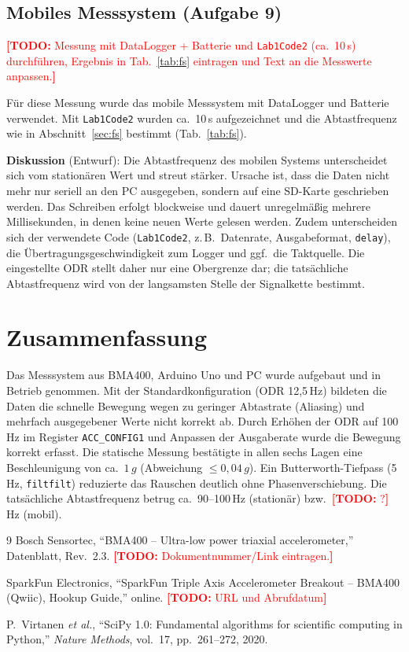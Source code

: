 \documentclass[a4paper,oneside,10pt]{article}
\newcommand{\todo}[1]{\textcolor{red}{\textbf{[TODO:} #1\textbf{]}}}
\begin{document}
\subsection{Mobiles Messsystem (Aufgabe 9)}

\todo{Messung mit DataLogger + Batterie und \texttt{Lab1Code2} (ca.\ 10\,s) durchführen,
Ergebnis in Tab.~\ref{tab:fs} eintragen und Text an die Messwerte anpassen.}

Für diese Messung wurde das mobile Messsystem mit DataLogger und Batterie verwendet.
Mit \texttt{Lab1Code2} wurden ca.\ 10\,s aufgezeichnet und die Abtastfrequenz wie in
Abschnitt~\ref{sec:fs} bestimmt (Tab.~\ref{tab:fs}).

\textbf{Diskussion} (Entwurf): Die Abtastfrequenz des mobilen Systems unterscheidet
sich vom stationären Wert und streut stärker. Ursache ist, dass die Daten nicht
mehr nur seriell an den PC ausgegeben, sondern auf eine SD-Karte geschrieben werden.
Das Schreiben erfolgt blockweise und dauert unregelmäßig mehrere Millisekunden, in
denen keine neuen Werte gelesen werden. Zudem unterscheiden sich der verwendete Code
(\texttt{Lab1Code2}, z.\,B.\ Datenrate, Ausgabeformat, \texttt{delay}), die
Übertragungsgeschwindigkeit zum Logger und ggf.\ die Taktquelle. Die eingestellte
ODR stellt daher nur eine Obergrenze dar; die tatsächliche Abtastfrequenz wird von
der langsamsten Stelle der Signalkette bestimmt.

\section{Zusammenfassung}
Das Messsystem aus BMA400, Arduino Uno und PC wurde aufgebaut und in Betrieb genommen.
Mit der Standardkonfiguration (ODR 12{,}5\,Hz) bildeten die Daten die schnelle
Bewegung wegen zu geringer Abtastrate (Aliasing) und mehrfach ausgegebener Werte
nicht korrekt ab. Durch Erhöhen der ODR auf 100\,Hz im Register \texttt{ACC\_CONFIG1}
und Anpassen der Ausgaberate wurde die Bewegung korrekt erfasst. Die statische Messung
bestätigte in allen sechs Lagen eine Beschleunigung von ca.\ $1\,g$ (Abweichung
$\leq 0{,}04\,g$). Ein Butterworth-Tiefpass (5\,Hz, \texttt{filtfilt}) reduzierte das
Rauschen deutlich ohne Phasenverschiebung. Die tatsächliche Abtastfrequenz betrug
ca.\ 90--100\,Hz (stationär) bzw.\ \todo{?}\,Hz (mobil).

\begin{thebibliography}{9}
Bosch Sensortec, ``BMA400 -- Ultra-low power triaxial accelerometer,'' Datenblatt,
Rev.~2.3. \todo{Dokumentnummer/Link eintragen.}

SparkFun Electronics, ``SparkFun Triple Axis Accelerometer Breakout -- BMA400 (Qwiic), Hookup Guide,'' online.
\todo{URL und Abrufdatum}

P.~Virtanen \emph{et al.}, ``SciPy 1.0: Fundamental algorithms for scientific computing in Python,''
\emph{Nature Methods}, vol.~17, pp.~261--272, 2020.
\end{thebibliography}
\end{document}
